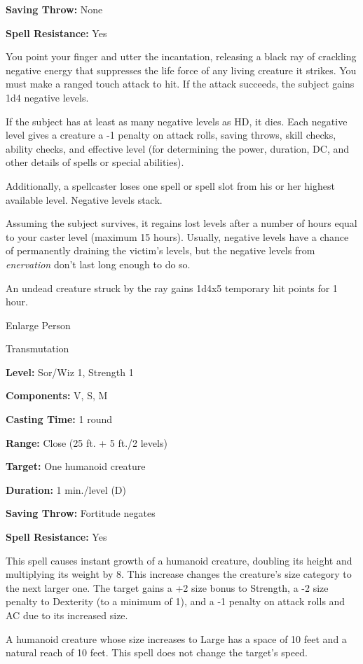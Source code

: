 \documentclass{article}
\begin{document}
\textbf{Saving Throw:} None

\textbf{Spell Resistance:} Yes

You point your finger and utter the incantation, releasing a black ray of crackling 
negative energy that suppresses the life force of any living creature it strikes. 
You must make a ranged touch attack to hit. If the attack succeeds, the subject 
gains 1d4 negative levels.

If the subject has at least as many negative levels as HD, it dies. Each negative 
level gives a creature a -1 penalty on attack rolls, saving throws, skill checks, 
ability checks, and effective level (for determining the power, duration, DC, and 
other details of spells or special abilities).

Additionally, a spellcaster loses one spell or spell slot from his or her highest 
available level. Negative levels stack.

Assuming the subject survives, it regains lost levels after a number of hours equal 
to your caster level (maximum 15 hours). Usually, negative levels have a chance 
of permanently draining the victim's levels, but the negative levels from \textit{enervation 
}don't last long enough to do so.

An undead creature struck by the ray gains 1d4x5 temporary hit points for 1 hour.

\vspace{12pt}
Enlarge Person

Transmutation

\textbf{Level:} Sor/Wiz 1, Strength 1

\textbf{Components:} V, S, M

\textbf{Casting Time:} 1 round

\textbf{Range:} Close (25 ft. + 5 ft./2 levels)

\textbf{Target:} One humanoid creature

\textbf{Duration:} 1 min./level (D)

\textbf{Saving Throw:} Fortitude negates

\textbf{Spell Resistance:} Yes

This spell causes instant growth of a humanoid creature, doubling its height and 
multiplying its weight by 8. This increase changes the creature's size category 
to the next larger one. The target gains a +2 size bonus to Strength, a -2 size 
penalty to Dexterity (to a minimum of 1), and a -1 penalty on attack rolls and 
AC due to its increased size.

A humanoid creature whose size increases to Large has a space of 10 feet and a 
natural reach of 10 feet. This spell does not change the target's speed.
\end{document}
